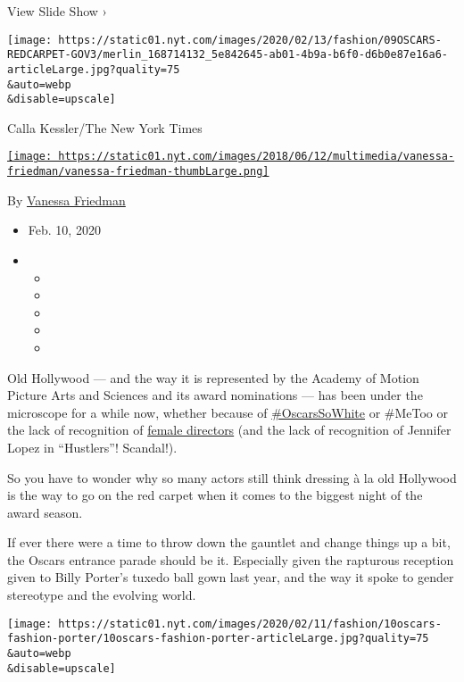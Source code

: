 View Slide Show ›

\texttt{[image: https://static01.nyt.com/images/2020/02/13/fashion/09OSCARS-REDCARPET-GOV3/merlin\_168714132\_5e842645-ab01-4b9a-b6f0-d6b0e87e16a6-articleLarge.jpg?quality=75\\\&auto=webp\\\&disable=upscale]}

Calla Kessler/The New York Times

\href{https://www.nytimes.com/by/vanessa-friedman}{\texttt{[image: https://static01.nyt.com/images/2018/06/12/multimedia/vanessa-friedman/vanessa-friedman-thumbLarge.png]}}

By \href{https://www.nytimes.com/by/vanessa-friedman}{Vanessa Friedman}

\begin{itemize}
\item
  Feb. 10, 2020
\item
  \begin{itemize}
  \item
  \item
  \item
  \item
  \item
  \end{itemize}
\end{itemize}

Old Hollywood --- and the way it is represented by the Academy of Motion
Picture Arts and Sciences and its award nominations --- has been under
the microscope for a while now, whether because of
\href{https://www.nytimes.com/2020/02/06/movies/oscarssowhite-history.html}{\#OscarsSoWhite}
or \#MeToo or the lack of recognition of
\href{https://www.nytimes.com/2019/12/12/movies/female-directors-oscars.html}{female
directors} (and the lack of recognition of Jennifer Lopez in
``Hustlers''! Scandal!).

So you have to wonder why so many actors still think dressing à la old
Hollywood is the way to go on the red carpet when it comes to the
biggest night of the award season.

If ever there were a time to throw down the gauntlet and change things
up a bit, the Oscars entrance parade should be it. Especially given the
rapturous reception given to Billy Porter's tuxedo ball gown last year,
and the way it spoke to gender stereotype and the evolving world.

\texttt{[image: https://static01.nyt.com/images/2020/02/11/fashion/10oscars-fashion-porter/10oscars-fashion-porter-articleLarge.jpg?quality=75\\\&auto=webp\\\&disable=upscale]}

